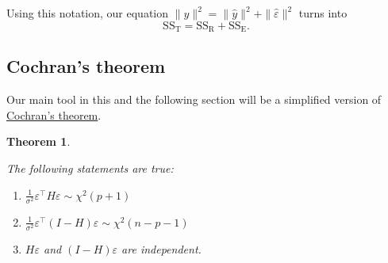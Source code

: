 \documentclass[
  a4paper,
]{article}
\newtheorem{theorem}{Theorem}[section]
\theoremstyle{definition}
\theoremstyle{definition}
\theoremstyle{definition}
\theoremstyle{definition}
\theoremstyle{remark}
\begin{document}
Using this notation, our equation
\(\|y\|^2 = \|\hat y\|^2 + \|\hat\varepsilon\|^2\)
turns into
\begin{equation*}
  \mathrm{SS}_\mathrm{T}
  = \mathrm{SS}_\mathrm{R} + \mathrm{SS}_\mathrm{E}.
\end{equation*}

\hypertarget{Cochran}{%
\subsection{Cochran's theorem}\label{Cochran}}

Our main tool in this and the following section will be a simplified
version of \href{https://en.wikipedia.org/wiki/Cochran\%27s_theorem}{Cochran's theorem}.

\begin{theorem}
\protect\hypertarget{thm:Cochran}{}\label{thm:Cochran}

The following statements are true:

\begin{enumerate}
\def\labelenumi{\arabic{enumi})}
\item
  \(\frac{1}{\sigma^2} \varepsilon^\top H \varepsilon\sim \chi^2(p+1)\)
\item
  \(\frac{1}{\sigma^2} \varepsilon^\top (I - H) \varepsilon\sim \chi^2(n - p - 1)\)
\item
  \(H \varepsilon\) and \((I-H)\varepsilon\) are independent.
\end{enumerate}

\end{theorem}
\end{document}
